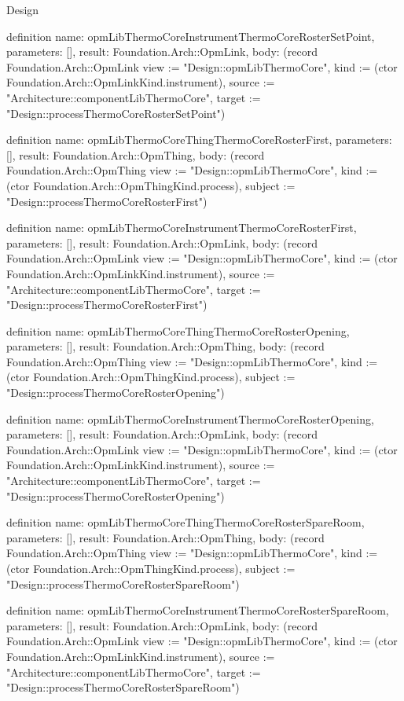 \begin{lexlean}{Design}
\begin{semanticmodule}
definition{
  name: opmLibThermoCoreInstrumentThermoCoreRosterSetPoint,
  parameters: [],
  result: Foundation.Arch::OpmLink,
  body: (record Foundation.Arch::OpmLink {view := "Design::opmLibThermoCore", kind := (ctor Foundation.Arch::OpmLinkKind.instrument), source := "Architecture::componentLibThermoCore", target := "Design::processThermoCoreRosterSetPoint"})
}

definition{
  name: opmLibThermoCoreThingThermoCoreRosterFirst,
  parameters: [],
  result: Foundation.Arch::OpmThing,
  body: (record Foundation.Arch::OpmThing {view := "Design::opmLibThermoCore", kind := (ctor Foundation.Arch::OpmThingKind.process), subject := "Design::processThermoCoreRosterFirst"})
}

definition{
  name: opmLibThermoCoreInstrumentThermoCoreRosterFirst,
  parameters: [],
  result: Foundation.Arch::OpmLink,
  body: (record Foundation.Arch::OpmLink {view := "Design::opmLibThermoCore", kind := (ctor Foundation.Arch::OpmLinkKind.instrument), source := "Architecture::componentLibThermoCore", target := "Design::processThermoCoreRosterFirst"})
}

definition{
  name: opmLibThermoCoreThingThermoCoreRosterOpening,
  parameters: [],
  result: Foundation.Arch::OpmThing,
  body: (record Foundation.Arch::OpmThing {view := "Design::opmLibThermoCore", kind := (ctor Foundation.Arch::OpmThingKind.process), subject := "Design::processThermoCoreRosterOpening"})
}

definition{
  name: opmLibThermoCoreInstrumentThermoCoreRosterOpening,
  parameters: [],
  result: Foundation.Arch::OpmLink,
  body: (record Foundation.Arch::OpmLink {view := "Design::opmLibThermoCore", kind := (ctor Foundation.Arch::OpmLinkKind.instrument), source := "Architecture::componentLibThermoCore", target := "Design::processThermoCoreRosterOpening"})
}

definition{
  name: opmLibThermoCoreThingThermoCoreRosterSpareRoom,
  parameters: [],
  result: Foundation.Arch::OpmThing,
  body: (record Foundation.Arch::OpmThing {view := "Design::opmLibThermoCore", kind := (ctor Foundation.Arch::OpmThingKind.process), subject := "Design::processThermoCoreRosterSpareRoom"})
}

definition{
  name: opmLibThermoCoreInstrumentThermoCoreRosterSpareRoom,
  parameters: [],
  result: Foundation.Arch::OpmLink,
  body: (record Foundation.Arch::OpmLink {view := "Design::opmLibThermoCore", kind := (ctor Foundation.Arch::OpmLinkKind.instrument), source := "Architecture::componentLibThermoCore", target := "Design::processThermoCoreRosterSpareRoom"})
}


\end{semanticmodule}
\end{lexlean}
